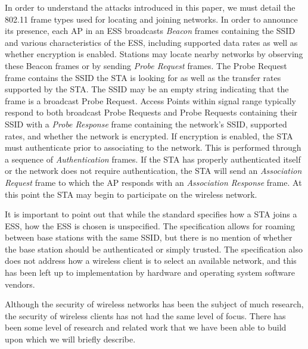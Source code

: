 \documentclass[10pt,twocolumn]{article}
\begin{document}
In order to understand the attacks introduced in this paper, we must
detail the 802.11 frame types used for locating and joining networks.
In order to announce its presence, each AP in an ESS broadcasts {\it
Beacon} frames containing the SSID and various characteristics of the
ESS, including supported data rates as well as whether encryption is
enabled.  Stations may locate nearby networks by observing these
Beacon frames or by sending {\it Probe Request} frames.  The Probe
Request frame contains the SSID the STA is looking for as well as the
transfer rates supported by the STA.  The SSID may be an empty string
indicating that the frame is a broadcast Probe Request.  Access Points
within signal range typically respond to both broadcast Probe Requests
and Probe Requests containing their SSID with a {\it Probe Response}
frame containing the network's SSID\footnotemark, supported rates, and
whether the network is encrypted.  If encryption is enabled, the STA
must authenticate prior to associating to the network.  This is
performed through a sequence of {\it Authentication} frames.  If the
STA has properly authenticated itself or the network does not require
authentication, the STA will send an {\it Association Request} frame
to which the AP responds with an {\it Association Response} frame.  At
this point the STA may begin to participate on the wireless network.


It is important to point out that while the standard specifies how a
STA joins a ESS, how the ESS is chosen is unspecified.  The
specification allows for roaming between base stations with the same
SSID, but there is no mention of whether the base station should be
authenticated or simply trusted.  The specification also does not
address how a wireless client is to select an available network, and
this has been left up to implementation by hardware and operating
system software vendors.

Although the security of wireless networks has been the subject of
much research, the security of wireless clients has not had the same
level of focus.  There has been some level of research and related
work that we have been able to build upon which we will briefly
describe.
\end{document}
